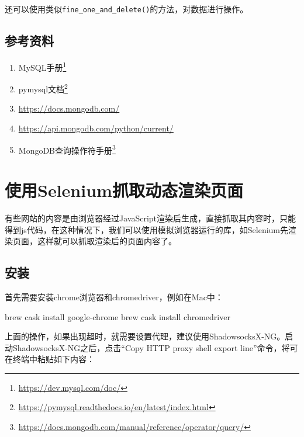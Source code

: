 \documentclass[]{ctexbook}
\newenvironment{Shaded}{\begin{snugshade}}{\end{snugshade}}
\newcommand{\ExtensionTok}[1]{#1}
\newcommand{\NormalTok}[1]{#1}
\providecommand{\tightlist}{%
  \setlength{\itemsep}{0pt}\setlength{\parskip}{0pt}}
\renewcommand{\href}[2]{#2\footnote{\url{#1}}}
\begin{document}
还可以使用类似\texttt{fine\_one\_and\_delete()}的方法，对数据进行操作。

\hypertarget{ux53c2ux8003ux8d44ux6599-4}{%
\section{参考资料}\label{ux53c2ux8003ux8d44ux6599-4}}

\begin{enumerate}
\def\labelenumi{\arabic{enumi}.}
\tightlist
\item
  \href{https://dev.mysql.com/doc/}{MySQL手册}
\item
  \href{https://pymysql.readthedocs.io/en/latest/index.html}{pymysql文档}
\item
  \url{https://docs.mongodb.com/}
\item
  \url{https://api.mongodb.com/python/current/}
\item
  \href{https://docs.mongodb.com/manual/reference/operator/query/}{MongoDB查询操作符手册}
\end{enumerate}

\hypertarget{selenium}{%
\chapter{使用Selenium抓取动态渲染页面}\label{selenium}}

有些网站的内容是由浏览器经过JavaScript渲染后生成，直接抓取其内容时，只能得到js代码，在这种情况下，我们可以使用模拟浏览器运行的库，如Selenium先渲染页面，这样就可以抓取渲染后的页面内容了。

\hypertarget{ux5b89ux88c5-1}{%
\section{安装}\label{ux5b89ux88c5-1}}

首先需要安装chrome浏览器和chromedriver，例如在Mac中：

\begin{Shaded}
\begin{Highlighting}[]
\ExtensionTok{brew}\NormalTok{ cask install google-chrome}
\ExtensionTok{brew}\NormalTok{ cask install chromedriver}
\end{Highlighting}
\end{Shaded}

上面的操作，如果出现超时，就需要设置代理，建议使用ShadowsocksX-NG。启动ShadowsocksX-NG之后，点击``Copy HTTP proxy shell export line''命令，将可在终端中粘贴如下内容：
\end{document}
